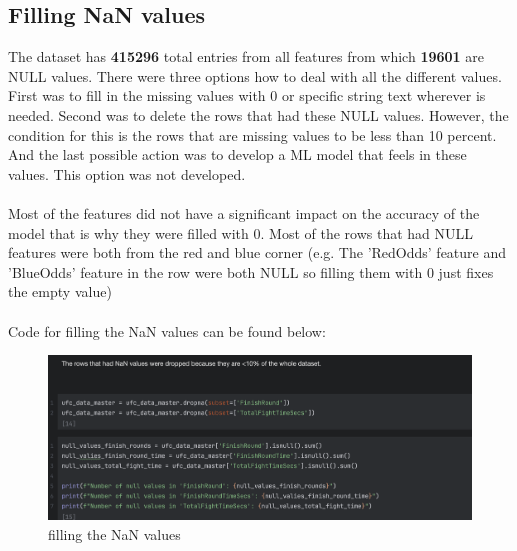 \documentclass{article}
\begin{document}
  \subsection{Filling NaN values}
  The dataset has \textbf{415296} total entries from all features from which \textbf{19601} are NULL values. There were three options how to deal with all the different values. 
  First was to fill in the missing values with 0 or specific string text wherever is needed. Second was to delete the rows that had these NULL values. However, 
  the condition for this is the rows that are missing values to be less than 10 percent. And the last possible action was to develop a ML model that feels in these 
  values. This option was not developed. \\\\ 
  Most of the features did not have a significant impact on the accuracy of the model that is why they were filled with 0. Most of the rows that had NULL features were both from the 
  red and blue corner (e.g. The 'RedOdds' feature and 'BlueOdds' feature in the row were both NULL so filling them with 0 just fixes the empty value)\\\\ 
  Code for filling the NaN values can be found below:
  \begin{figure}[H]
  	\centering
  	\includegraphics[width=1\textwidth]{images/Filling_NaN_Values.png}
  	\caption{filling the NaN values}
  	\label{fig:filling_nan_values}
  \end{figure}
\end{document}
